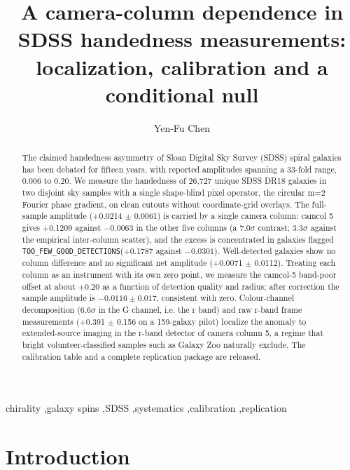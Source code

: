 \documentclass[preprint,12pt,authoryear]{elsarticle}
\newcommand{\toofew}{\texttt{TOO\_\allowbreak FEW\_\allowbreak GOOD\_\allowbreak DETECTIONS}}
\begin{document}
\begin{frontmatter}

\title{A camera-column dependence in SDSS handedness measurements: localization, calibration and a conditional null}

\author[1]{Yen-Fu Chen}


\begin{abstract}
The claimed handedness asymmetry of Sloan Digital Sky Survey (SDSS) spiral galaxies has been
debated for fifteen years, with reported amplitudes spanning a 33-fold range, 0.006 to 0.20. We
measure the handedness of 26,727 unique SDSS DR18 galaxies in two disjoint sky samples with a single
shape-blind pixel operator, the circular m=2 Fourier phase gradient, on clean cutouts without
coordinate-grid overlays. The full-sample amplitude (+0.0214 $\pm$ 0.0061) is carried by a single
camera column: camcol 5 gives +0.1209 against $-0.0063$ in the other five columns (a 7.0$\sigma$
contrast; 3.3$\sigma$ against the empirical inter-column scatter), and the excess is concentrated in
galaxies flagged \toofew (+0.1787 against $-0.0301$). Well-detected galaxies show
no column difference and no significant net amplitude (+0.0071 $\pm$ 0.0112). Treating each column
as an instrument with its own zero point, we measure the camcol-5 band-poor offset at about +0.20 as
a function of detection quality and radius; after correction the sample amplitude is
$-0.0116 \pm 0.017$, consistent with zero. Colour-channel decomposition (6.6$\sigma$ in the G channel, i.e. the r band) and raw r-band frame measurements (+0.391 $\pm$ 0.156 on a 159-galaxy pilot) localize the
anomaly to extended-source imaging in the r-band detector of camera column 5, a regime that bright
volunteer-classified samples such as Galaxy Zoo naturally exclude. The calibration table and a
complete replication package are released.
\end{abstract}

\begin{keyword}
chirality \sep galaxy spins \sep SDSS \sep systematics \sep calibration \sep replication
\end{keyword}

\end{frontmatter}

\section{Introduction}
\end{document}
